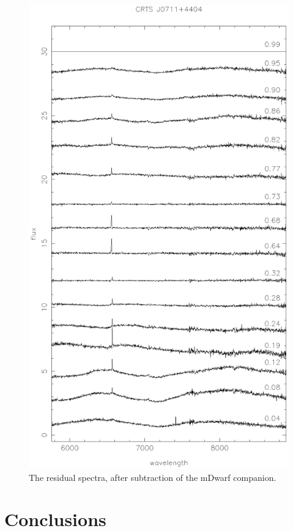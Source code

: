 \documentclass[a4paper,fleqn,usenatbib]{mnras}
\begin{document}
\begin{figure}
\centering
\includegraphics[width=\textwidth]{images/subtracted_stacked.eps}
\caption[Caption for spectrum]{The residual spectra, after subtraction of the mDwarf companion.  }
\label{fig:sloanfit}
\end{figure}


\section{Conclusions}
\end{document}
